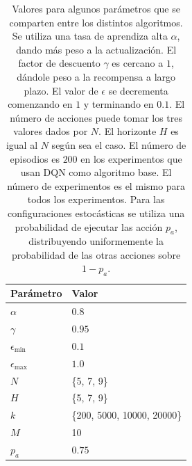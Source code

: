 \begin{table}[]
\centering
\caption{Valores para algunos parámetros que se comparten entre los distintos algoritmos. Se 
utiliza una tasa de aprendiza alta $\alpha$, dando más peso a la actualización. El factor de 
descuento $\gamma$ es cercano a $1$, dándole peso a la recompensa a largo plazo. El valor de $\epsilon$ se decrementa comenzando en $1$ y terminando en $0.1$. El número de acciones puede 
tomar los tres valores dados por $N$. El horizonte $H$ es igual al $N$ según sea el caso. El número de episodios es $200$ en los experimentos que usan DQN como algoritmo base. El número de experimentos es el mismo para todos los experimentos. Para las configuraciones estocásticas se utiliza una probabilidad de ejecutar las acción $p_a$, distribuyendo uniformemente la probabilidad de las otras acciones sobre $1-p_a$.}
\label{tab:switch-params}
\begin{tabular}{ll}
\hline
Parámetro                                                                                      & Valor    \\ \hline
$\alpha$                                                                                       & $0.8$      \\
$\gamma$                                                                                       & $0.95$     \\
$\epsilon_{\min}$                                                                              & $0.1$      \\
$\epsilon_{\max}$                                                                              & $1.0$      \\
$N$                                                                                            & \{5, 7, 9\} \\
$H$                                                                                            & \{5, 7, 9\} \\
$k$                                                                                            & \{200, 5000, 10000, 20000\}\\
$M$                                                                                            & 10       \\
$p_a$ & $0.75$      \\ \hline
\end{tabular}
\end{table}

\clearpage

\clearpage

\clearpage

\clearpage
